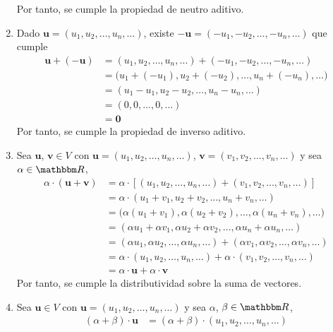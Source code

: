 \begin{examplebox}{}{}
\begin{enumerate}[label=\roman*), topsep=6pt, itemsep=0pt]
        Por tanto, se cumple la propiedad de neutro aditivo.
        \item Dado $\mathbf{u} = (u_1, u_2, \dots, u_n, \dots)$, existe $-\mathbf{u} = (-u_1, -u_2, \dots, -u_n, \dots)$ que cumple
        \begin{align*}
            \mathbf{u} + (-\mathbf{u}) & = (u_1, u_2, \dots, u_n, \dots) + (-u_1, -u_2, \dots, -u_n, \dots) \\
            & = \big(u_1 + (-u_1), u_2 + (-u_2), \dots, u_n + (-u_n), \dots \big) \\
            & = (u_1 - u_1, u_2 - u_2, \dots, u_n - u_n, \dots) \\
            & = (0, 0, \dots, 0, \dots) \\
            & = \mathbf{0}
        \end{align*}
        Por tanto, se cumple la propiedad de inverso aditivo.
        \item Sea $\mathbf{u}$, $\mathbf{v} \in V$ con $\mathbf{u} = (u_1, u_2, \dots, u_n, \dots)$, $\mathbf{v} = (v_1, v_2, \dots, v_n, \dots)$ y sea $\alpha \in \RR$,
        \begin{align*}
            \alpha \cdot (\mathbf{u} + \mathbf{v}) & = \alpha \cdot [(u_1, u_2, \dots, u_n, \dots) + (v_1, v_2, \dots, v_n, \dots)] \\
            & = \alpha \cdot (u_1 + v_1, u_2 + v_2, \dots, u_n + v_n, \dots) \\
            & = \big( \alpha(u_1 + v_1), \alpha(u_2 + v_2), \dots, \alpha(u_n + v_n), \dots \big) \\
            & = (\alpha u_1 + \alpha v_1, \alpha u_2 + \alpha v_2, \dots, \alpha u_n + \alpha u_n, \dots) \\
            & = (\alpha u_1, \alpha u_2, \dots, \alpha u_n, \dots) + (\alpha v_1, \alpha v_2, \dots, \alpha v_n, \dots) \\
            & = \alpha \cdot (u_1, u_2, \dots, u_n, \dots) + \alpha \cdot (v_1, v_2, \dots, v_n, \dots) \\
            & = \alpha \cdot \mathbf{u} + \alpha \cdot \mathbf{v}
        \end{align*}
        \newpage
        Por tanto, se cumple la distributividad sobre la suma de vectores.
        \item Sea $\mathbf{u} \in V$ con $\mathbf{u} = (u_1, u_2, \dots, u_n, \dots)$ y sea $\alpha$, $\beta \in \RR$,
        \begin{align*}
            (\alpha + \beta) \cdot \mathbf{u} & = (\alpha + \beta) \cdot (u_1, u_2, \dots, u_n, \dots) \\

\end{align*}
\end{enumerate}
\end{examplebox}
